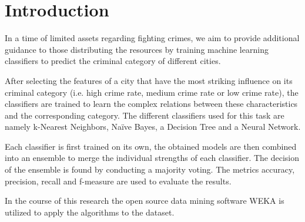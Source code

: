 \section{Introduction}

In a time of limited assets regarding fighting crimes,
we aim to provide additional guidance to
those distributing the resources by training machine learning
classifiers to predict the criminal category of different cities.

After selecting the features of a city that have the most striking
influence on its criminal category (i.e. high crime rate, medium crime
rate or low crime rate), the classifiers are trained to learn the
complex relations between these characteristics and the corresponding
category. The different classifiers used for this task are
namely k-Nearest Neighbors, Na\"ive Bayes, a Decision Tree and a
Neural Network.

Each classifier is first trained on its own, the obtained models are
then combined into an ensemble to merge the individual
strengths of each classifier. The decision of the ensemble is found by
conducting a majority voting.
The metrics accuracy, precision, recall and f-measure are
used to evaluate the results.

In the course of this research the open source data mining software
WEKA is utilized to apply the algorithms to the dataset.

